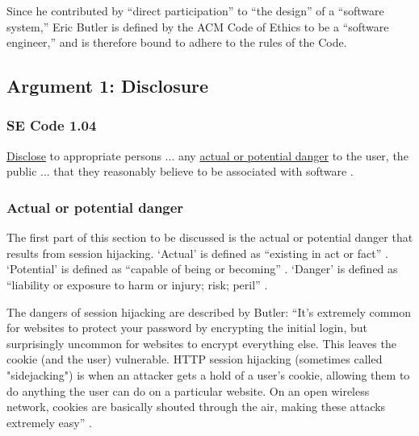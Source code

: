 \documentclass[11pt]{article}
\begin{document}
\begin{multicols}{2}
Since he contributed by ``direct participation'' to ``the design'' of a ``software system,'' Eric Butler is defined by the ACM Code of Ethics to be a ``software engineer,'' and is therefore bound to adhere to the rules of the Code\cite{se-code}.




\subsection{Argument 1: Disclosure}
\subsubsection{SE Code 1.04}
\uline{Disclose} to appropriate persons ... any \uline{actual or potential danger} to the user, the public ... that they reasonably believe to be associated with software \cite{se-code}. 

\subsubsection{Actual or potential danger}
The first part of this section to be discussed is the actual or potential danger that results from session hijacking. `Actual' is defined as ``existing in act or fact'' \cite{actual}. `Potential' is defined as ``capable of being or becoming'' \cite{potential}. `Danger' is defined as ``liability or exposure to harm or injury; risk; peril'' \cite{danger}. 

The dangers of session hijacking are described by Butler: ``It's extremely common for websites to protect your password by encrypting the initial login, but surprisingly uncommon for websites to encrypt everything else. This leaves the cookie (and the user) vulnerable. HTTP session hijacking (sometimes called "sidejacking") is when an attacker gets a hold of a user's cookie, allowing them to do anything the user can do on a particular website. On an open wireless network, cookies are basically shouted through the air, making these attacks extremely easy'' \cite{eric-butler}. 


\end{multicols}
\end{document}
